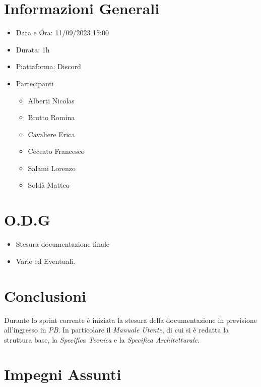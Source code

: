 \documentclass[a4paper, 12pt]{article}
\begin{document}
\makefrontpage

\section*{Informazioni Generali}
\begin{itemize}
    \item Data e Ora: 11/09/2023 15:00
    \item Durata: 1h
    \item Piattaforma: Discord
    \item Partecipanti
    \begin{itemize}
        \item Alberti Nicolas
        \item Brotto Romina
        \item Cavaliere Erica
        \item Ceccato Francesco
        \item Salami Lorenzo
        \item Soldà Matteo
    \end{itemize}
\end{itemize}

\section*{O.D.G}
\begin{itemize}
    \item Stesura documentazione finale
    \item Varie ed Eventuali.
\end{itemize}

\section*{Conclusioni}
Durante lo sprint corrente è iniziata la stesura della documentazione in previsione all'ingresso in \textit{PB}. 
In particolare il \textit{Manuale Utente}, di cui si è redatta la struttura base, la \textit{Specifica Tecnica} e la \textit{Specifica Architetturale}.



\section*{Impegni Assunti}
\end{document}
